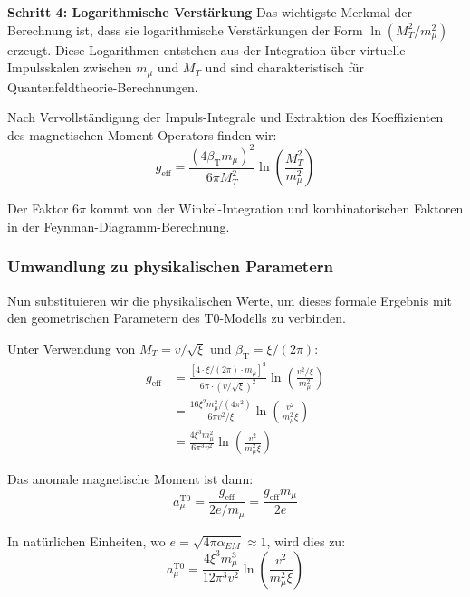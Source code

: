 \documentclass[12pt,a4paper]{article}
\newcommand{\betaT}{\beta_{\text{T}}}
\newcommand{\xipar}{\xi}
\begin{document}
	\textbf{Schritt 4: Logarithmische Verstärkung}
	Das wichtigste Merkmal der Berechnung ist, dass sie logarithmische Verstärkungen der Form $\ln(M_T^2/m_{\mu}^2)$ erzeugt. Diese Logarithmen entstehen aus der Integration über virtuelle Impulsskalen zwischen $m_{\mu}$ und $M_T$ und sind charakteristisch für Quantenfeldtheorie-Berechnungen.
	
	Nach Vervollständigung der Impuls-Integrale und Extraktion des Koeffizienten des magnetischen Moment-Operators finden wir:
	\begin{equation}
		g_{\text{eff}} = \frac{(4\betaT m_{\mu})^2}{6\pi M_T^2} \ln\left(\frac{M_T^2}{m_{\mu}^2}\right)
	\end{equation}
	
	Der Faktor $6\pi$ kommt von der Winkel-Integration und kombinatorischen Faktoren in der Feynman-Diagramm-Berechnung.
	
	\subsubsection{Umwandlung zu physikalischen Parametern}
	
	Nun substituieren wir die physikalischen Werte, um dieses formale Ergebnis mit den geometrischen Parametern des T0-Modells zu verbinden.
	
	Unter Verwendung von $M_T = v/\sqrt{\xipar}$ und $\betaT = \xipar/(2\pi)$:
	\begin{align}
		g_{\text{eff}} &= \frac{[4 \cdot \xipar/(2\pi) \cdot m_{\mu}]^2}{6\pi \cdot (v/\sqrt{\xipar})^2} \ln\left(\frac{v^2/\xipar}{m_{\mu}^2}\right) \\
		&= \frac{16\xipar^2 m_{\mu}^2/(4\pi^2)}{6\pi v^2/\xipar} \ln\left(\frac{v^2}{m_{\mu}^2 \xipar}\right) \\
		&= \frac{4\xipar^3 m_{\mu}^2}{6\pi^3 v^2} \ln\left(\frac{v^2}{m_{\mu}^2 \xipar}\right)
	\end{align}
	
	Das anomale magnetische Moment ist dann:
	\begin{equation}
		a_{\mu}^{\text{T0}} = \frac{g_{\text{eff}}}{2e/m_{\mu}} = \frac{g_{\text{eff}} m_{\mu}}{2e}
	\end{equation}
	
	In natürlichen Einheiten, wo $e = \sqrt{4\pi\alpha_{EM}} \approx 1$, wird dies zu:
	\begin{equation}
		a_{\mu}^{\text{T0}} = \frac{4\xipar^3 m_{\mu}^3}{12\pi^3 v^2} \ln\left(\frac{v^2}{m_{\mu}^2 \xipar}\right)
	\end{equation}
	
\end{document}
